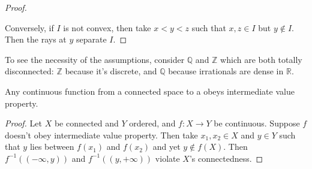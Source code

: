 \begin{proof}
\begin{mylist}
\begin{center}
			\end{center}
		\end{mylist}
		
		Conversely, if $I$ is not convex, then take $x < y < z$ such that $x, z\in I$ but $y\notin I$. Then the rays at $y$ separate $I$.
	\end{proof}
	
	\begin{rmk}
		To see the necessity of the assumptions, consider $\mathbb Q$ and $\mathbb Z$ \resp which are both totally disconnected: $\mathbb Z$ because it's discrete, and $\mathbb Q$ because irrationals are dense in $\mathbb R$.
	\end{rmk}
	
	
	\begin{prp}
		Any continuous function from a connected space to a \LOTS obeys intermediate value property.
	\end{prp}
	
	\begin{proof}
		Let $X$ be connected and $Y$ ordered, and $f\colon X\to Y$ be continuous. Suppose $f$ doesn't obey intermediate value property. Then take $x_1, x_2\in X$ and $y\in Y$ such that $y$ lies between $f(x_1)$ and $f(x_2)$ and yet $y\notin f(X)$. Then $f^{-1}((-\infty, y))$ and $f^{-1}((y, +\infty))$ violate $X$'s connectedness.
	\end{proof}
	
	
	
